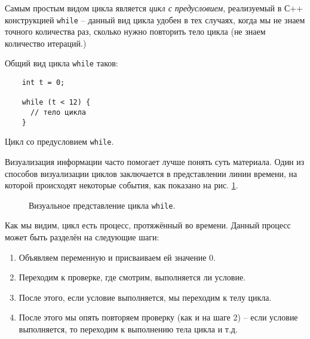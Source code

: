 \documentclass[../sparc.tex]{subfiles}
\begin{document}
Самым простым видом цикла является \emph{цикл с предусловием}, реализуемый в С++
конструкцией \texttt{while} -- данный вид цикла удобен в тех случаях, когда мы не
знаем точного количества раз, сколько нужно повторить тело цикла (не знаем
количество итераций.)

Общий вид цикла \texttt{while} таков:

\begin{listing}[ht]
  \begin{verbatim}
    int t = 0;

    while (t < 12) {
      // тело цикла
    }
  \end{verbatim}
  \label{listing:dialogues-with-computer-while}
  \caption{Цикл со предусловием \texttt{while}.}
\end{listing}

Визуализация информации часто помогает лучше понять суть материала. Один из
способов визуализации циклов заключается в представлении линии времени, на
которой происходят некоторые события, как показано на рис.
\ref{fig:control-flow-while-loop}.

\begin{figure}[ht]
  \centering
  \label{fig:control-flow-while-loop}
  \caption{Визуальное представление цикла \texttt{while}.}
\end{figure}

Как мы видим, цикл есть процесс, протяжённый во времени. Данный процесс может
быть разделён на следующие шаги:

\begin{enumerate}
\item Объявляем переменную и присваиваем ей значение 0.
\item Переходим к проверке, где смотрим, выполняется ли условие.
\item После этого, если условие выполняется, мы переходим к телу цикла.
\item После этого мы опять повторяем проверку (как и на шаге 2) -- если условие
  выполняется, то переходим к выполнению тела цикла и т.д.
\end{enumerate}
\end{document}
